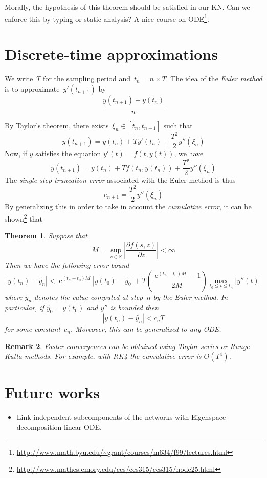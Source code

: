 \documentclass{article}
\newtheorem{theorem}{Theorem}
\newtheorem{remark}[theorem]{Remark}
\newcommand{\ce}{{\mathop{\mathrm{e}}}}
\newcommand{\R}{\mathbb{R}}
\begin{document}
Morally, the hypothesis of this theorem should be satisfied in our KN. Can we
enforce this by typing or static analysis? A nice course on
ODE\footnote{\url{http://www.math.byu.edu/~grant/courses/m634/f99/lectures.html}}.

\section{Discrete-time approximations}
We write~$T$ for the sampling period and~$t_n=n\times T$. The idea of the
\emph{Euler method} is to approximate~$y'(t_{n+1})$ by
\[
\frac{y(t_{n+1})-y(t_n)}n
\]

By Taylor's theorem, there exists~$\xi_n\in[t_n,t_{n+1}]$ such that
\[
y(t_{n+1})=y(t_n)+Ty'(t_n)+\frac{T^2}2 y''(\xi_n)
\]
Now, if $y$ satisfies the equation $y'(t)=f(t,y(t))$, we have
\[
y(t_{n+1})=y(t_n)+Tf(t_n,y(t_n))+\frac{T^2}2 y''(\xi_n)
\]
The \emph{single-step truncation error} associated with the Euler method is thus
\[
e_{n+1}=\frac{T^2}2 y''(\xi_n)
\]
By generalizing this in order to take in account the \emph{cumulative error}, it
can be
shown\footnote{\url{http://www.mathcs.emory.edu/ccs/ccs315/ccs315/node25.html}}
that

\begin{theorem}
  Suppose that
  \[
  M=\sup_{s\in\R}\left|\frac{\partial f(s,z)}{\partial z}\right|<\infty
  \]
  Then we have the following error bound
  \[
  |y(t_n)-\tilde{y_n}|<\ce^{(t_n-t_0)M}|y(t_0)-\tilde{y_0}|+T\left(\frac{\ce^{(t_n-t_0)M}-1}{2M}\right)\max_{t_0\leq t\leq t_n}|y''(t)|
  \]
  where $\tilde{y_n}$ denotes the value computed at step~$n$ by the Euler
  method. In particular, if $\tilde{y_0}=y(t_0)$ and $y''$ is bounded then
  \[
  |y(t_n)-\tilde{y_n}|<c_nT
  \]
  for some constant~$c_n$. Moreover, this can be generalized to any ODE.
\end{theorem}

\begin{remark}
  Faster convergences can be obtained using Taylor series or Runge-Kutta
  methods. For example, with RK4 the cumulative error is $O(T^4)$.
\end{remark}

\section{Future works}
\begin{itemize}
\item Link independent subcomponents of the networks with Eigenspace
  decomposition linear ODE.
\end{itemize}



\end{document}
